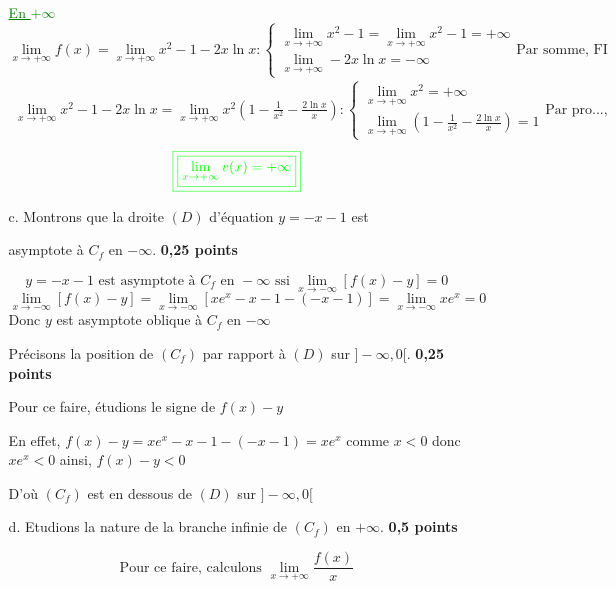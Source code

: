 \documentclass[12pt]{article}
\begin{document}
\begin{enumerate}
\begin{enumerate}
\textcolor{green}{\underline{En $+\infty$}}
\[
\lim_{x \to +\infty}f(x)=\lim_{x \to +\infty}x^{2}-1-2x\ln x : 
\begin{cases}
\lim_{x \to +\infty}x^{2}-1=\lim_{x \to +\infty}x^{2}-1=+\infty\\
\lim_{x \to +\infty}-2x\ln x=-\infty
\end{cases}
\text{Par somme, FI}
\]
\begin{align*}
\lim_{x \to +\infty}x^{2}-1-2x\ln x=\lim_{x \to +\infty}x^{2}\left(1-\frac{1}{x^{2}}-\frac{2\ln x}{x} \right):
\begin{cases}
\lim_{x \to +\infty}x^{2}=+\infty\\
\lim_{x \to +\infty}\left(1-\frac{1}{x^{2}}-\frac{2\ln x}{x}\right)=1
\end{cases}
\text{Par pro..., } 
\end{align*}
\[\textcolor{green}{\boxed{\textcolor{green}{\boxed{\lim_{x\to +\infty}v(x)=+\infty}}}}\]
\item[c.]Montrons que la droite $(D)$ d'équation $y=-x-1$ est

 asymptote à $C_{f}$ en $-\infty$. \textbf{ 0,25 points}

\[y=-x-1 \text{ est asymptote à } C_{f} \text{ en } -\infty \text{ ssi } \lim_{x \to -\infty}\left[f(x)-y \right]=0 \]
\[\lim_{x \to -\infty}\left[f(x)-y \right]=\lim_{x \to -\infty}\left[xe^{x}-x-1-(-x-1) \right]=\lim_{x \to -\infty}xe^{x}=0\]
Donc $y$ est asymptote oblique à $ C_{f}$ en $-\infty$

Précisons la position de $(C_{f})$ par rapport à $(D)$ sur $]-\infty, 0[.$ \textbf{ 0,25 points}

Pour ce faire, étudions le signe de $f(x)-y$

En effet, $f(x)-y=xe^{x}-x-1-(-x-1)=xe^{x}$ comme $x < 0 $ donc $xe^{x} < 0$ ainsi, $f(x)-y<0$

D'où  $(C_{f})$ est en dessous de $(D)$ sur $]-\infty, 0[$
\item[d.]Etudions la nature de la branche infinie de $(C_{f})$ en $+\infty$.\textbf{ 0,5 points}

\[\text{Pour ce faire, calculons } \lim_{x \to +\infty}\frac{f(x)}{x} \]


\end{enumerate}
\end{enumerate}
\end{document}
